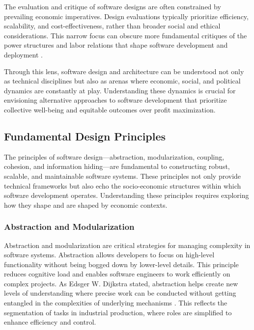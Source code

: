 \begin{refsection}
The evaluation and critique of software designs are often constrained by prevailing economic imperatives. Design evaluations typically prioritize efficiency, scalability, and cost-effectiveness, rather than broader social and ethical considerations. This narrow focus can obscure more fundamental critiques of the power structures and labor relations that shape software development and deployment \cite[pp.~78-80]{Marx1867}.

Through this lens, software design and architecture can be understood not only as technical disciplines but also as arenas where economic, social, and political dynamics are constantly at play. Understanding these dynamics is crucial for envisioning alternative approaches to software development that prioritize collective well-being and equitable outcomes over profit maximization.

\subsection{Fundamental Design Principles}

The principles of software design—abstraction, modularization, coupling, cohesion, and information hiding—are fundamental to constructing robust, scalable, and maintainable software systems. These principles not only provide technical frameworks but also echo the socio-economic structures within which software development operates. Understanding these principles requires exploring how they shape and are shaped by economic contexts.

\subsubsection{Abstraction and Modularization}

Abstraction and modularization are critical strategies for managing complexity in software systems. Abstraction allows developers to focus on high-level functionality without being bogged down by lower-level details. This principle reduces cognitive load and enables software engineers to work efficiently on complex projects. As Edsger W. Dijkstra stated, abstraction helps create new levels of understanding where precise work can be conducted without getting entangled in the complexities of underlying mechanisms \cite[pp.~112-115]{Dijkstra1982}. This reflects the segmentation of tasks in industrial production, where roles are simplified to enhance efficiency and control.


\end{refsection}
